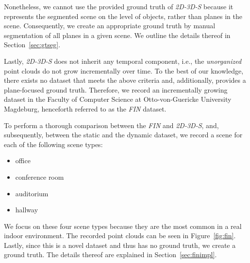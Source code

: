 \documentclass[main.tex]{subfiles}
\begin{document}
Nonetheless, we cannot use the provided ground truth of \textit{2D-3D-S} because it represents the segmented scene on the level of objects, rather than planes in the scene.
Consequently, we create an appropriate ground truth by manual segmentation of all planes in a given scene.
We outline the details thereof in Section~\ref{sec:gtseg}.

Lastly, \textit{2D-3D-S} does not inherit any temporal component, i.e., the \textit{unorganized} point clouds do not grow incrementally over time.
To the best of our knowledge, there exists no dataset that meets the above criteria and, additionally, provides a plane-focused ground truth.
Therefore, we record an incrementally growing dataset in the Faculty of Computer Science at Otto-von-Guericke University Magdeburg,
henceforth referred to as the \textit{FIN} dataset.



To perform a thorough comparison between the \textit{FIN} and \textit{2D-3D-S}, and, subsequently, between the static and the dynamic dataset, we record a scene for each of the following scene types:
\begin{itemize}
    \item office
    \item conference room
    \item auditorium
    \item hallway
\end{itemize}

We focus on these four scene types because they are the most common in a real indoor environment.
The recorded point clouds can be seen in Figure~\ref{fig:fin}.
Lastly, since this is a novel dataset and thus has no ground truth, we create a ground truth. The details thereof are explained in Section~\ref{sec:finimpl}.
\end{document}
